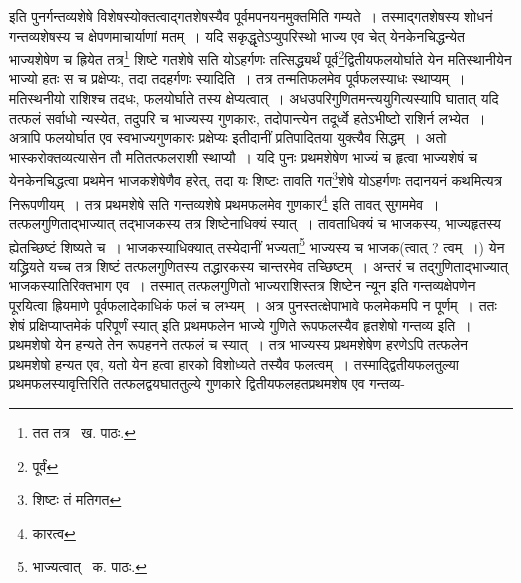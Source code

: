 \documentclass[11pt, openany]{book}
\begin{document}
\noindent इति पुनर्गन्तव्यशेषे विशेषस्योक्तत्वाद्गतशेषस्यैव पूर्वमपनयनमुक्तमिति गम्यते~। तस्माद्गतशेषस्य शोधनं गन्तव्यशेषस्य च क्षेपणमाचार्याणां मतम्~। यदि सकृद्धृतेऽप्युपरिस्थो भाज्य एव चेत् येनकेनचिद्धन्येत भाज्यशेषेण च ह्रियेत तत्र\renewcommand{\thefootnote}{१}\footnote{तत तत्र \textendash\ ख. पाठः.} शिष्टे गतशेषे सति योऽहर्गणः
तत्सिद्ध्यर्थं पूर्व\renewcommand{\thefootnote}{२}\footnote{पूर्वं}द्वितीयफलयोर्घाते येन मतिस्थानीयेन भाज्यो हतः स च प्रक्षेप्यः, तदा तदहर्गणः स्यादिति~। तत्र तन्मतिफलमेव पूर्वफलस्याधः स्थाप्यम्~। मतिस्थनीयो राशिश्च तदधः, फलयोर्घाते तस्य क्षेप्यत्वात्~। अधउपरिगुणितमन्त्ययुगित्यस्यापि घातात् यदि तत्फलं सर्वाधो न्यस्येत, तदुपरि च भाज्यस्य गुणकारः, तदोपान्त्येन तदूर्ध्वे हतेऽभीष्टो राशिर्न लभ्येत~। अत्रापि फलयोर्घात एव स्वभाज्यगुणकारः प्रक्षेप्यः इतीदानीं प्रतिपादितया युक्त्यैव सिद्धम्~। अतो भास्करोक्तव्यत्यासेन तौ मतितत्फलराशी स्थाप्यौ~। यदि पुनः प्रथमशेषेण भाज्यं च हृत्वा भाज्यशेषं च येनकेनचिद्धत्वा प्रथमेन भाजकशेषेणैव हरेत्, तदा यः शिष्टः तावति गत\renewcommand{\thefootnote}{३}\footnote{शिष्टः तं मतिगत}शेषे योऽहर्गणः तदानयनं कथमित्यत्र निरूपणीयम्~। तत्र प्रथमशेषे सति गन्तव्यशेषे प्रथमफलमेव गुणकार\renewcommand{\thefootnote}{४}\footnote{कारत्व} इति तावत् सुगममेव~। तत्फलगुणिताद्भाज्यात् तद्भाजकस्य तत्र शिष्टेनाधिक्यं स्यात्~। तावताधिक्यं च भाजकस्य, भाज्यहृतस्य ह्येतच्छिष्टं शिष्यते च~। भाजकस्याधिक्यात् तस्येदानीं भज्यता\renewcommand{\thefootnote}{५}\footnote{भाज्यत्वात् \textendash\ क. पाठः.} भाज्यस्य च भाजक(त्वात् ? त्वम्~।) येन यद्ध्रियते यच्च तत्र शिष्टं तत्फलगुणितस्य तद्धारकस्य चान्तरमेव तच्छिष्टम्~। अन्तरं च तद्गुणिताद्भाज्यात् भाजकस्यातिरिक्तभाग एव~। तस्मात् तत्फलगुणितो भाज्यराशिस्तत्र शिष्टेन न्यून इति गन्तव्यक्षेपणेन पूरयित्वा ह्रियमाणे पूर्वफलादेकाधिकं फलं च लभ्यम्~। अत्र पुनस्तत्क्षेपाभावे फलमेकमपि न पूर्णम्~। ततः शेषं प्रक्षिप्याप्तमेकं परिपूर्णं स्यात् इति प्रथमफलेन भाज्ये गुणिते रूपफलस्यैव हृतशेषो गन्तव्य इति~। प्रथमशेषो येन हन्यते तेन रूपहनने तत्फलं च स्यात्~। तत्र भाज्यस्य प्रथमशेषेण हरणेऽपि तत्फलेन प्रथमशेषो हन्यत एव, यतो येन हत्वा हारको विशोध्यते तस्यैव फलत्वम्~। तस्माद्द्वितीयफलतुल्या प्रथमफलस्यावृत्तिरिति तत्फलद्वयघाततुल्ये गुणकारे द्वितीयफलहतप्रथमशेष एव गन्तव्य-

\newpage
\end{document}
